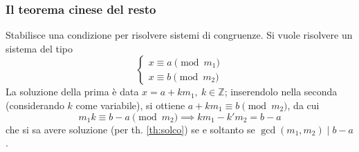 \documentclass[11pt, a4paper]{scrartcl}
\theoremstyle{definition}
\numberwithin{esempio}{section}
\theoremstyle{definition}
\numberwithin{obs}{section}
\numberwithin{nota}{section}
\numberwithin{equation}{subsection}
\begin{document}
\subsubsection{Il teorema cinese del resto}

Stabilisce una condizione per risolvere sistemi di congruenze.
Si vuole risolvere un sistema del tipo 
\begin{equation}\label{sisp}
\begin{cases}
	x \equiv a\pmod{m_1}\\
	x \equiv b\pmod{m_2}
\end{cases}
\end{equation} 
La soluzione della prima \`e data $x = a + km_1, \ k \in \mathbb{Z}$; inserendolo nella seconda (considerando $k$ come variabile), si ottiene $a+ km_1 \equiv b \pmod{m_2} $, da cui
\[
m_1 k \equiv b -a \pmod{m_2} \implies k m_1 - k' m_2 = b-a
\] 
che si sa avere soluzione (per th. \ref{th:solco}) se e soltanto se $\operatorname{gcd}(m_1,m_2)  \mid b-a$.
\end{document}
